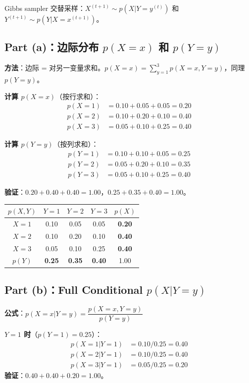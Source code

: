 \documentclass[11pt,a4paper]{article}
\begin{document}
Gibbs sampler 交替采样：$X^{(t+1)} \sim p(X | Y = y^{(t)})$ 和 $Y^{(t+1)} \sim p(Y | X = x^{(t+1)})$。

\subsection*{Part (a)：边际分布 $p(X=x)$ 和 $p(Y=y)$}

\textbf{方法}：边际 = 对另一变量求和。$p(X=x) = \sum_{y=1}^{3} p(X\!=\!x, Y\!=\!y)$，同理 $p(Y=y)$。

\medskip
\textbf{计算 $p(X=x)$}（按行求和）：
\begin{align*}
p(X=1) &= 0.10 + 0.05 + 0.05 = 0.20 \\
p(X=2) &= 0.10 + 0.20 + 0.10 = 0.40 \\
p(X=3) &= 0.05 + 0.10 + 0.25 = 0.40
\end{align*}

\textbf{计算 $p(Y=y)$}（按列求和）：
\begin{align*}
p(Y=1) &= 0.10 + 0.10 + 0.05 = 0.25 \\
p(Y=2) &= 0.05 + 0.20 + 0.10 = 0.35 \\
p(Y=3) &= 0.05 + 0.10 + 0.25 = 0.40
\end{align*}

\textbf{验证}：$0.20 + 0.40 + 0.40 = 1.00$，$0.25 + 0.35 + 0.40 = 1.00$。

\begin{center}
\begin{tabular}{c|ccc|c}
$p(X,Y)$ & $Y\!=\!1$ & $Y\!=\!2$ & $Y\!=\!3$ & $p(X)$ \\
\hline
$X\!=\!1$ & 0.10 & 0.05 & 0.05 & \textbf{0.20} \\
$X\!=\!2$ & 0.10 & 0.20 & 0.10 & \textbf{0.40} \\
$X\!=\!3$ & 0.05 & 0.10 & 0.25 & \textbf{0.40} \\
\hline
$p(Y)$ & \textbf{0.25} & \textbf{0.35} & \textbf{0.40} & 1.00
\end{tabular}
\end{center}

\subsection*{Part (b)：Full Conditional $p(X | Y = y)$}

\textbf{公式}：$p(X\!=\!x | Y\!=\!y) = \dfrac{p(X\!=\!x, Y\!=\!y)}{p(Y\!=\!y)}$

\medskip
\textbf{$Y = 1$ 时}（$p(Y\!=\!1) = 0.25$）：
\begin{align*}
p(X\!=\!1 | Y\!=\!1) &= 0.10 / 0.25 = 0.40 \\
p(X\!=\!2 | Y\!=\!1) &= 0.10 / 0.25 = 0.40 \\
p(X\!=\!3 | Y\!=\!1) &= 0.05 / 0.25 = 0.20
\end{align*}
\textbf{验证}：$0.40 + 0.40 + 0.20 = 1.00$。
\end{document}
